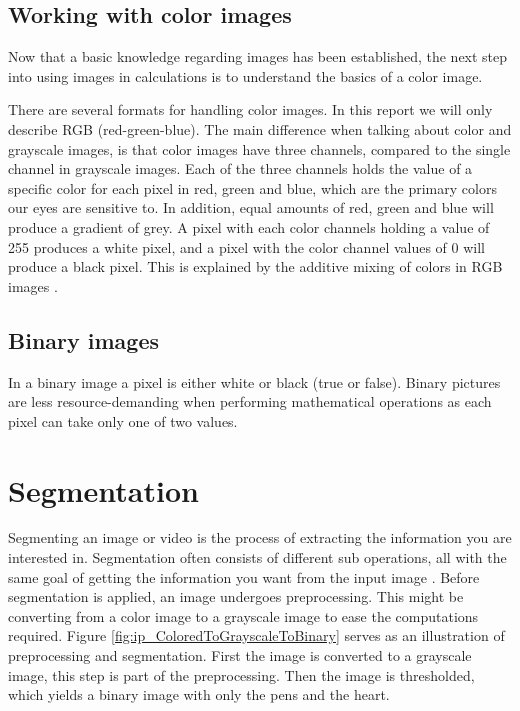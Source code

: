 \subsection{Working with color images}
Now that a basic knowledge regarding images has been established, the next step into using images in calculations is to understand the basics of a color image.

There are several formats for handling color images. In this report we will only describe RGB (red-green-blue). The main difference when talking about color and grayscale images, is that color images have three channels, compared to the single channel in grayscale images. Each of the three channels holds the value of a specific color for each pixel in red, green and blue, which are the primary colors our eyes are sensitive to. In addition, equal amounts of red, green and blue will produce a gradient of grey. A pixel with each color channels holding a value of 255 produces a white pixel, and a pixel with the color channel values of 0 will produce a black pixel. This  is explained by the additive mixing of colors in RGB images \citep{ip_book}. %

\subsection{Binary images}
In a binary image a pixel is either white or black (true or false). Binary pictures are less resource-demanding when performing mathematical operations as each pixel can take only one of two values.

\section{Segmentation}
Segmenting an image or video is the process of extracting the information you are interested in. Segmentation often consists of different sub operations, all with the same goal of getting the information you want from the input image \citep{ip_book}. Before segmentation is applied, an image undergoes preprocessing. This might be converting from a color image to a grayscale image to ease the computations required. Figure \ref{fig:ip_ColoredToGrayscaleToBinary} serves as an illustration of preprocessing and segmentation. First the image is converted to a grayscale image, this step is part of the preprocessing. Then the image is thresholded, which yields a binary image with only the pens and the heart. 

